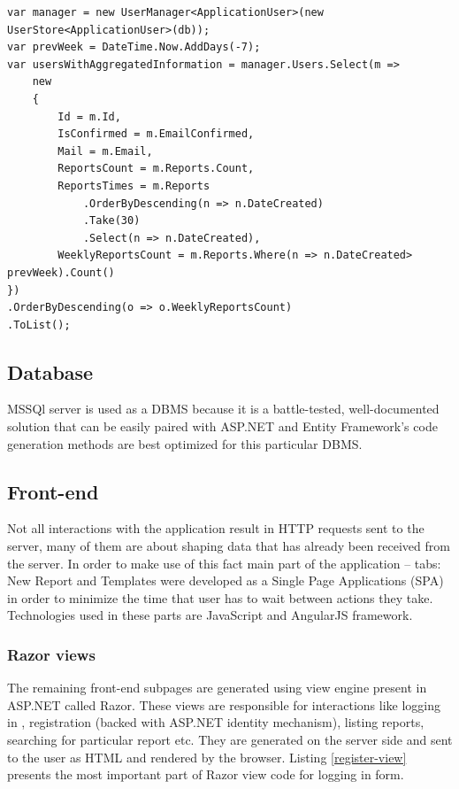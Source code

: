 \documentclass[12pt, twoside, openany]{report}
\theoremstyle{definition}
\begin{document}
\begin{lstlisting}[style=sharpc,caption=C\# code that is converted by Entity Framework to SQL sent to SQL Server \label{get-user-data}]
var manager = new UserManager<ApplicationUser>(new UserStore<ApplicationUser>(db));
var prevWeek = DateTime.Now.AddDays(-7);
var usersWithAggregatedInformation = manager.Users.Select(m =>
	new 
	{
		Id = m.Id,
		IsConfirmed = m.EmailConfirmed,
		Mail = m.Email,
		ReportsCount = m.Reports.Count,
		ReportsTimes = m.Reports
			.OrderByDescending(n => n.DateCreated)
			.Take(30)
			.Select(n => n.DateCreated),
		WeeklyReportsCount = m.Reports.Where(n => n.DateCreated> prevWeek).Count()
})
.OrderByDescending(o => o.WeeklyReportsCount)
.ToList();

\end{lstlisting}

\subsection{Database}
MSSQl server is used as a DBMS because it is a battle-tested, well-documented solution that can be easily paired with ASP.NET and Entity Framework's code generation methods are best optimized for this particular DBMS. 

\subsection{Front-end}
Not all interactions with the application result in HTTP requests sent to the server, many of them are about shaping data that has already been received from the server. In order to make use of this fact main part of the application -- tabs: New Report and Templates were developed as a Single Page Applications (SPA) in order to minimize the time that user has to wait between actions they take. Technologies used in these parts are JavaScript and AngularJS framework. 
\subsubsection{Razor views}
The remaining front-end subpages are generated using view engine present in ASP.NET called Razor. These views are responsible for interactions like logging in , registration (backed with ASP.NET identity mechanism), listing reports, searching for particular report etc. They are generated on the server side and sent to the user as HTML and rendered by the browser. Listing \ref{register-view} presents the most important part of Razor view code for logging in form. 
\end{document}
